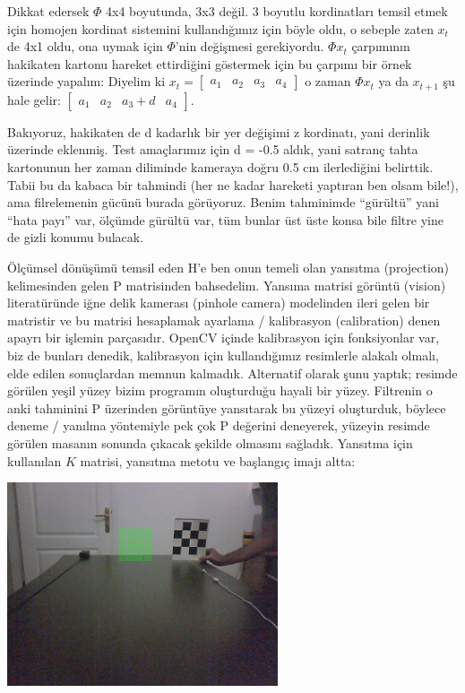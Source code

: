 \documentclass[12pt,fleqn]{article}\usepackage{../../common}
\begin{document}
Dikkat edersek $\Phi$ 4x4 boyutunda, 3x3 değil. 3 boyutlu kordinatları temsil
etmek için homojen kordinat sistemini kullandığımız için böyle oldu, o sebeple
zaten $x_t$ de 4x1 oldu, ona uymak için $\Phi$'nin değişmesi gerekiyordu. $\Phi
x_t$ çarpımının hakikaten kartonu hareket ettirdiğini göstermek için bu çarpımı
bir örnek üzerinde yapalım: Diyelim ki $x_t =
\left[\begin{array}{cccc}a_1&a_2&a_3&a_4\end{array}\right]$ o zaman $\Phi x_t$
ya da $x_{t+1}$ şu hale gelir:
$\left[\begin{array}{cccc}a_1&a_2&a_3+d&a_4\end{array}\right]$.


Bakıyoruz, hakikaten de d kadarlık bir yer değişimi z kordinatı, yani
derinlik üzerinde eklenmiş. Test amaçlarımız için d = -0.5 aldık, yani
satranç tahta kartonunun her zaman diliminde kameraya doğru 0.5 cm
ilerlediğini belirttik. Tabii bu da kabaca bir tahmindi (her ne kadar
hareketi yaptıran ben olsam bile!), ama filrelemenin gücünü burada
görüyoruz. Benim tahminimde ``gürültü'' yani ``hata payı'' var, ölçümde
gürültü var, tüm bunlar üst üste konsa bile filtre yine de gizli konumu
bulacak.

Ölçümsel dönüşümü temsil eden H'e ben onun temeli olan yansıtma
(projection) kelimesinden gelen P matrisinden bahsedelim. Yansıma matrisi
görüntü (vision) literatüründe iğne delik kamerası (pinhole camera)
modelinden ileri gelen bir matristir ve bu matrisi hesaplamak ayarlama /
kalibrasyon (calibration) denen apayrı bir işlemin parçasıdır. OpenCV
içinde kalibrasyon için fonksiyonlar var, biz de bunları denedik,
kalibrasyon için kullandığımız resimlerle alakalı olmalı, elde edilen
sonuçlardan memnun kalmadık. Alternatif olarak şunu yaptık; resimde görülen
yeşil yüzey bizim programın oluşturduğu hayali bir yüzey. Filtrenin o anki
tahminini P üzerinden görüntüye yansıtarak bu yüzeyi oluşturduk, böylece
deneme / yanılma yöntemiyle pek çok P değerini deneyerek, yüzeyin resimde
görülen masanın sonunda çıkacak şekilde olmasını sağladık. Yansıtma için
kullanılan $K$ matrisi, yansıtma metotu ve başlangıç imajı altta:

\includegraphics[height=6cm]{tser_kf_02.png}
\end{document}
